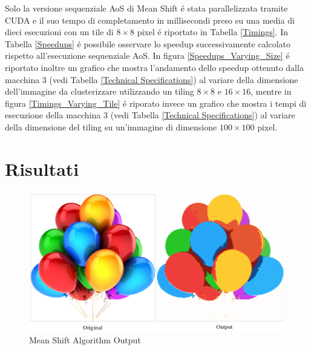 \documentclass{article}
\begin{document}
\vspace{30px}

\noindent Solo la versione sequenziale AoS di Mean Shift \'e stata parallelizzata tramite CUDA e il suo tempo di completamento in millisecondi preso su una media di dieci esecuzioni con un tile di $ 8\times8 $ pixel \'e riportato in Tabella \ref{Timings}. In Tabella \ref{Speedups} \'e possibile osservare lo speedup successivamente calcolato rispetto all'esecuzione sequenziale AoS. In figura \ref{Speedups_Varying_Size} \'e riportato inoltre un grafico che mostra l'andamento dello speedup ottenuto dalla macchina $ 3 $ (vedi Tabella \ref{Technical Specifications}) al variare della dimensione dell'immagine da clusterizzare utilizzando un tiling $ 8\times8 $ e $ 16\times16 $, mentre in figura \ref{Timings_Varying_Tile} \'e riporato invece un grafico che mostra i tempi di esecuzione della macchina $ 3 $ (vedi Tabella \ref{Technical Specifications}) al variare della dimensione del tiling su un'immagine di dimensione $ 100\times100 $ pixel.   

\newpage

\section{Risultati}

\begin{figure}[!h]
\centering
\includegraphics[width= 13cm]{"Immagini/Output.PNG"}
\caption{Mean Shift Algorithm Output}
\label{Output}
\end{figure}
\end{document}
